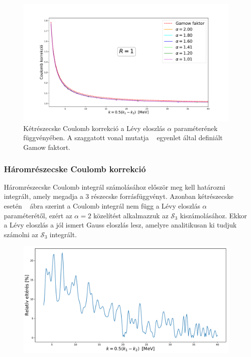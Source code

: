 \documentclass[11pt,a4paper]{article}
\numberwithin{equation}{subsection}
\numberwithin{figure}{section}
\begin{document}
\begin{figure}[H]
\centering
\includegraphics[scale=0.45]{pic/Coulomb/C2_dalpha_R1_S2correct.pdf}
\caption{Kétrészecske Coulomb korrekció a Lévy eloszlás $\alpha$ paraméterének függvényében. A szaggatott vonal mutatja ~ egyenlet által definiált Gamow faktort.}
\label{fig:CRK2dalpha}
\end{figure}

\subsubsection{Háromrészecske Coulomb korrekció}

Háromrészecske Coulomb integrál számolásához először meg kell határozni ~ integrált, amely megadja a 3 részecske forrásfüggvényt. Azonban kétrészecske esetén ~ ábra szerint a Coulomb integrál nem függ a Lévy eloszlás $\alpha$ paraméterétől, ezért az $\alpha=2$ közelítést alkalmazzuk az $\mathcal{S}_3$ kiszámolásához. Ekkor a Lévy eloszlás a jól ismert Gauss eloszlás lesz, amelyre analitikusan ki tudjuk számolni az $\mathcal{S}_3$ integrált.

\begin{figure}[H]
\centering
\includegraphics[scale=0.5]{pic/Coulomb/K3_error1.pdf}
\end{figure}
\end{document}
